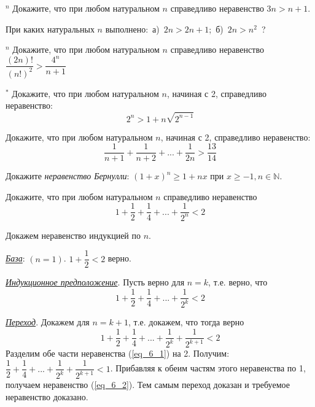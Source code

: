 \begin{thm}$^n$ \label{6.0 n1}
Докажите, что при любом натуральном $n$ справедливо неравенство $3n > n + 1$. 
\end{thm}

\begin{thm}
При каких натуральных $n$ выполнено:~а)~$2n > 2n + 1$;~б)~$2n > n^2$~?
\end{thm}

\begin{thm}$^n$ \label{6.0 n2}
Докажите, что при любом натуральном $n$ справедливо неравенство $\dfrac{(2n)!}{(n!)^2} > \dfrac{4^n}{n+1}$
\end{thm}

\begin{thm}$^\ast$
Докажите, что при любом натуральном $n$, начиная с 2, справедливо неравенство: 	
$$2^n > 1 + n \sqrt{2^{n-1}}$$\end{thm}

\begin{thm}
Докажите, что при любом натуральном $n$, начиная с 2, справедливо неравенство: 
    $$\dfrac{1}{n + 1} + \dfrac{1}{n+2} + ... + \dfrac{1}{2n} > \dfrac{13}{14}$$
\end{thm}

\begin{thm}
Докажите \textit{неравенство Бернулли}: $(1 + x)^n \geq 1 + nx$ при $x \geq -1, n \in \mathbb{N}$.
\end{thm}

\begin{thm}
Докажите, что при любом натуральном $n$ справедливо неравенство $$1 + \dfrac{1}{2} + \dfrac{1}{4} + ... + \dfrac{1}{2^n} < 2$$
\end{thm}

\begin{prf} Докажем неравенство индукцией по $n$.
\par
\textit{\underline{База}}: $(n = 1)$. $1 + \dfrac{1}{2} < 2$ верно.
\par
\textit{\underline{Индукционное предположение}}. Пусть верно для $n = k$, т.е. верно, что 
\begin{equation} \label{eq_6_1}
    1 + \dfrac{1}{2} + \dfrac{1}{4} + ... + \dfrac{1}{2^k} < 2
\end{equation}
\par
\textit{\underline{Переход}}. Докажем для $n = k + 1$, т.е. докажем, что тогда верно
\begin{equation} \label{eq_6_2}1 + \dfrac{1}{2} + \dfrac{1}{4} + ... + \dfrac{1}{2^k} + \dfrac{1}{2^{k+1}} < 2
\end{equation}
Разделим обе части неравенства (\ref{eq_6_1}) на 2. Получим: $\dfrac{1}{2} + \dfrac{1}{4} + ... + \dfrac{1}{2^k} + \dfrac{1}{2^{k+1}} < 1$. Прибавляя к обеим частям этого неравенства по 1, получаем неравенство (\ref{eq_6_2}). Тем самым переход доказан и требуемое неравенство доказано. 
\end{prf}

